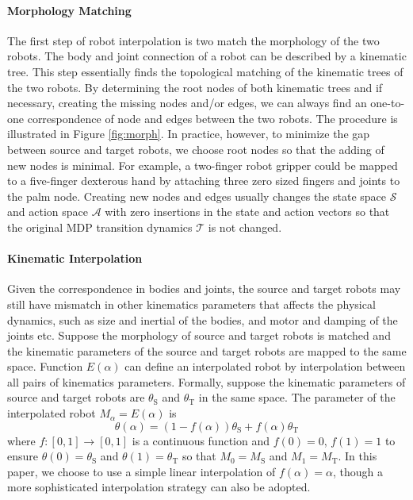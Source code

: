 \documentclass[nohyperref]{article}
\theoremstyle{plain}
\theoremstyle{definition}
\theoremstyle{remark}
\begin{document}
\paragraph{Morphology Matching}
The first step of robot interpolation is two match the morphology of the two robots.
The body and joint connection of a robot can be described by a kinematic tree.
This step essentially finds the topological matching of the kinematic trees of the two robots.
By determining the root nodes of both kinematic trees and if necessary, creating the missing nodes and/or edges, we can always find an one-to-one correspondence of node and edges between the two robots.
The procedure is illustrated in Figure \ref{fig:morph}.
In practice, however, to minimize the gap between source and target robots, we choose root nodes so that the adding of new nodes is minimal.
For example, a two-finger robot gripper could be mapped to a five-finger dexterous hand by attaching three zero sized fingers and joints to the palm node.
Creating new nodes and edges usually changes the state space $\mathcal{S}$ and action space $\mathcal{A}$ with zero insertions in the state and action vectors so that the original MDP transition dynamics $\mathcal{T}$ is not changed.



\paragraph{Kinematic Interpolation}
Given the correspondence in bodies and joints, the source and target robots may still have mismatch in other kinematics parameters that affects the physical dynamics, such as size and inertial of the bodies, and motor and damping of the joints etc.
Suppose the morphology of source and target robots is matched and the kinematic parameters of the source and target robots are mapped to the same space.
Function $E(\alpha)$ can define an interpolated robot by interpolation between all pairs of kinematics parameters.
Formally, suppose the kinematic parameters of source and target robots are $\theta_\text{S}$ and $\theta_\text{T}$ in the same space.
The parameter of the interpolated robot $M_\alpha=E(\alpha)$ is
\begin{equation}
\theta(\alpha)= (1-f(\alpha)) \theta_\text{S} + f(\alpha) \theta_\text{T}
\end{equation}
where $f:[0,1]\rightarrow[0,1]$ is a continuous function and $f(0)=0$, $f(1)=1$ to ensure $\theta(0)=\theta_\text{S}$ and $\theta(1)=\theta_\text{T}$ so that $M_0=M_\text{S}$ and $M_1=M_\text{T}$. 
In this paper, we choose to use a simple linear interpolation of $f(\alpha)=\alpha$, though a more sophisticated interpolation strategy can also be adopted.
\end{document}
